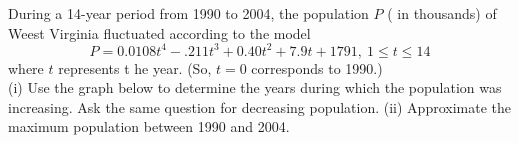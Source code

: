 \documentclass[11pt]{article}
\begin{document}
\vfill

{}  During a 14-year period from 1990 to 2004, the population $P$ ( in thousands) of Weest Virginia fluctuated according to the model 
$$P=0.0108t^4-.211t^3+0.40t^2+7.9t+1791, \: 1 \leq t \leq 14$$
where $t$ represents t he year. (So, $t=0$ corresponds to 1990.)\\
(i) Use the graph below to determine the years during which the population was increasing. Ask the same question for decreasing population.
(ii) Approximate the maximum population between 1990 and 2004.\\

 \\
\end{document}
